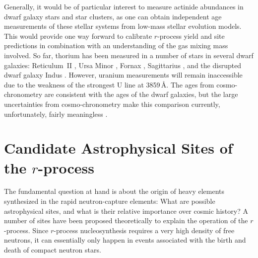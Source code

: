 \documentclass[letterpaper]{article}
\begin{document}
Generally, it would be of particular interest to measure actinide abundances in dwarf galaxy stars and star clusters, as one can obtain independent age measurements of these stellar systems from low-mass stellar evolution models. This would provide one way forward to calibrate $r$-process yield and site predictions in combination with an understanding of the gas mixing mass involved. So far, thorium has been measured in a number of stars in several dwarf galaxies: Reticulum~II \citep{Ji2018}, Ursa Minor \citep{aoki2007_cos82}, Fornax \citep{Reichert2021}, Sagittarius \citep{Hansen2020}, and the disrupted dwarf galaxy Indus \citep{Hansen2021}. However, uranium measurements will remain inaccessible due to the weakness of the strongest U line at 3859\,{\AA}.
The ages from cosmo-chronometry are consistent with the ages of the dwarf galaxies, but the large uncertainties from cosmo-chronometry make this comparison currently, unfortunately, fairly meaningless \citep{aoki2007_cos82}.





\section{Candidate Astrophysical Sites of the $r$-process}\label{candidates}

The fundamental question at hand is about the origin of heavy elements synthesized in the rapid neutron-capture elements: What are possible astrophysical sites, and what is their relative importance over cosmic history?
A number of sites have been proposed theoretically to explain the operation of the $r$-process.
Since  $r$-process nucleosynthesis requires a very high density of free neutrons, it can essentially only happen in events associated with the birth and death of compact neutron stars.
\end{document}
